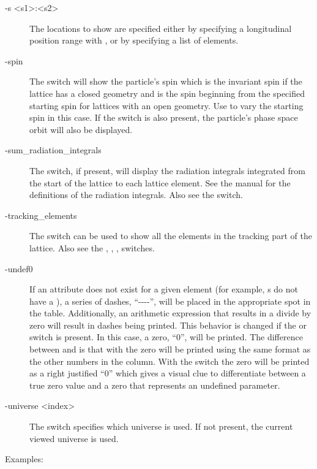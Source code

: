 {{{{{{{{\begin{description}
%
\item[-s <s1>:<s2>] \Newline
The locations to show are specified either by specifying a longitudinal position range with ,
or by specifying a list  of elements. 
%
\item[-spin] \Newline
The  switch will show the particle's spin which is the invariant spin if the lattice has a
closed geometry and is the spin beginning from the specified starting spin for lattices with an open
geometry. Use  to vary the starting spin in this case. If the  switch
is also present, the particle's phase space orbit will also be displayed.
%
\item[-sum_radiation_integrals] \Newline
The  switch, if present, will display the radiation integrals
integrated from the start of the lattice to each lattice element. See the \bmad manual for the
definitions of the radiation integrals. Also see the  switch.
%
\item[-tracking_elements] \Newline
The  switch can be used to show all the elements in the tracking part of the
lattice. Also see the , , ,  switches.
%
\item[-undef0] \Newline
If an attribute does not exist for a given element (for example, s do not have a
), a series of dashes, ``-{}-{}-{}-'', will be placed in the appropriate spot in the
table.  Additionally, an arithmetic expression that results in a divide by zero will result in
dashes being printed. This behavior is changed if the  or  switch is
present. In this case, a zero, ``0'', will be printed. The difference between  and
 is that with  the zero will be printed using the same format as the other
numbers in the column. With the  switch the zero will be printed as a right justified
``0'' which gives a visual clue to differentiate between a true zero value and a zero that
represents an undefined parameter.
%
\item[-universe <index>] \Newline
The  switch specifies which universe is used. If not present, the current viewed universe is
used.
\end{description}

Examples:

}}}}}}}}
